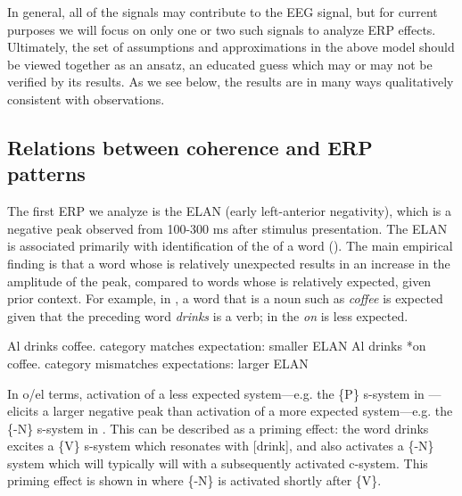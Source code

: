 In general, all of the  signals may contribute to the EEG signal, but for current purposes we will focus on only one or two such signals to analyze ERP effects. Ultimately, the set of assumptions and approximations in the above model should be viewed together as an ansatz, an educated guess which may or may not be verified by its results. As we see below, the results are in many ways qualitatively consistent with observations.

\subsection{Relations between coherence and ERP patterns}

The first ERP we analyze is the ELAN (early left-anterior negativity), which is a negative peak observed from 100-300 ms after stimulus presentation. The ELAN is associated primarily with identification of the  of a word (\citealt{Friederici2002,HahneFriederici1999,SteinhauerDrury2012}). The main empirical finding is that a word whose  is relatively unexpected results in an increase in the amplitude of the peak, compared to words whose  is relatively expected, given prior context. For example, in , a word that is a noun such as \textit{coffee} is expected given that the preceding word \textit{drinks} is a  verb; in  the  \textit{on} is less expected.

\ea\label{ex:6:23}
\ea\label{ex:6:23a} Al drinks coffee. \hspace{3mm} category matches expectation: smaller ELAN
\ex\label{ex:6:23b} Al drinks *on coffee. \hspace{3mm} category mismatches expectations: larger ELAN
\z
\z

In o/el terms, activation of a less expected system—e.g. the \{P\} s-system in —elicits a larger negative peak than activation of a more expected system—e.g. the \{-N\} s-system in . This can be described as a priming effect: the word drinks excites a \{V\} s-system which resonates with [drink], and also activates a \{-N\} system which will typically will  with a subsequently activated c-system. This priming effect is shown in {} where \{-N\} is activated shortly after \{V\}. 

